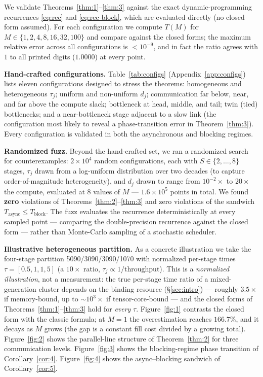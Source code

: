 \documentclass[11pt]{article}
\begin{document}
We validate Theorems~\ref{thm:1}--\ref{thm:3} against the exact dynamic-programming recurrences \eqref{eq:rec} and \eqref{eq:rec-block}, which are evaluated directly (no closed form assumed). For each configuration we compute $T(M)$ for $M\in\{1,2,4,8,16,32,100\}$ and compare against the closed forms; the maximum relative error across all configurations is $<10^{-9}$, and in fact the ratio agrees with $1$ to all printed digits ($1.0000$) at every point.

\textbf{Hand-crafted configurations.} Table~\ref{tab:configs} (Appendix~\ref{app:configs}) lists eleven configurations designed to stress the theorems: homogeneous and heterogeneous $\tau_j$; uniform and non-uniform $d_j$; communication far below, near, and far above the compute slack; bottleneck at head, middle, and tail; twin (tied) bottlenecks; and a near-bottleneck stage adjacent to a slow link (the configuration most likely to reveal a phase-transition error in Theorem~\ref{thm:3}). Every configuration is validated in both the asynchronous and blocking regimes.

\textbf{Randomized fuzz.} Beyond the hand-crafted set, we ran a randomized search for counterexamples: $2\times10^4$ random configurations, each with $S\in\{2,\dots,8\}$ stages, $\tau_j$ drawn from a log-uniform distribution over two decades (to capture order-of-magnitude heterogeneity), and $d_j$ drawn to range from $10^{-2}\times$ to $20\times$ the compute, evaluated at $8$ values of $M$ --- $1.6\times10^5$ points in total. We found \textbf{zero} violations of Theorems~\ref{thm:2}--\ref{thm:3} and zero violations of the sandwich $T_{\text{async}}\le T_{\text{block}}$. The fuzz evaluates the recurrence deterministically at every sampled point --- comparing the double-precision recurrence against the closed form --- rather than Monte-Carlo sampling of a stochastic scheduler.

\textbf{Illustrative heterogeneous partition.} As a concrete illustration we take the four-stage partition 5090/3090/3090/1070 with normalized per-stage times $\tau=[0.5,1,1,5]$ (a $10\times$ ratio, $\tau_j\propto 1/\text{throughput}$). This is a \emph{normalized illustration}, not a measurement: the true per-stage time ratio of a mixed-generation cluster depends on the binding resource (\S\ref{sec:intro}) --- roughly $3.5\times$ if memory-bound, up to $\sim10^3\times$ if tensor-core-bound --- and the closed forms of Theorems~\ref{thm:1}--\ref{thm:3} hold for \emph{every} $\tau$. Figure~\ref{fig:1} contrasts the closed form with the classic formula; at $M=1$ the overestimation reaches $166.7\%$, and it decays as $M$ grows (the gap is a constant fill cost divided by a growing total). Figure~\ref{fig:2} shows the parallel-line structure of Theorem~\ref{thm:2} for three communication levels. Figure~\ref{fig:3} shows the blocking-regime phase transition of Corollary~\ref{cor:4}. Figure~\ref{fig:4} shows the async--blocking sandwich of Corollary~\ref{cor:5}.
\end{document}
